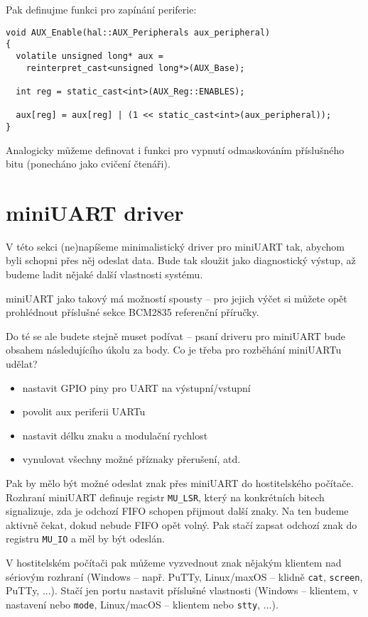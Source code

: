\documentclass{article}
\begin{document}
Pak definujme funkci pro zapínání periferie:

\begin{lstlisting}
void AUX_Enable(hal::AUX_Peripherals aux_peripheral)
{
  volatile unsigned long* aux =
    reinterpret_cast<unsigned long*>(AUX_Base);
    
  int reg = static_cast<int>(AUX_Reg::ENABLES);
  
  aux[reg] = aux[reg] | (1 << static_cast<int>(aux_peripheral));
}
\end{lstlisting}

Analogicky můžeme definovat i funkci pro vypnutí odmaskováním příslušného bitu (ponecháno jako cvičení čtenáři).


\section{miniUART driver}

V této sekci (ne)napíšeme minimalistický driver pro miniUART tak, abychom byli schopni přes něj odeslat data. Bude tak sloužit jako diagnostický výstup, až budeme ladit nějaké další vlastnosti systému.

miniUART jako takový má možností spousty -- pro jejich výčet si můžete opět prohlédnout příslušné sekce BCM2835 referenční příručky.

Do té se ale budete stejně muset podívat -- psaní driveru pro miniUART bude obsahem následujícího úkolu za body. Co je třeba pro rozběhání miniUARTu udělat?

\begin{itemize}
	\item nastavit GPIO piny pro UART na výstupní/vstupní
	\item povolit aux periferii UARTu
	\item nastavit délku znaku a modulační rychlost
	\item vynulovat všechny možné příznaky přerušení, atd.
\end{itemize}

Pak by mělo být možné odeslat znak přes miniUART do hostitelského počítače. Rozhraní miniUART definuje registr \texttt{MU\_LSR}, který na konkrétních bitech signalizuje, zda je odchozí FIFO schopen přijmout další znaky. Na ten budeme aktivně čekat, dokud nebude FIFO opět volný. Pak stačí zapsat odchozí znak do registru \texttt{MU\_IO} a měl by být odeslán.

V hostitelském počítači pak můžeme vyzvednout znak nějakým klientem nad sériovým rozhraní (Windows -- např. PuTTy, Linux/maxOS -- klidně \texttt{cat}, \texttt{screen}, PuTTy, ...). Stačí jen portu nastavit příslušné vlastnosti (Windows -- klientem, v nastavení nebo \texttt{mode}, Linux/macOS -- klientem nebo \texttt{stty}, ...).
\end{document}
